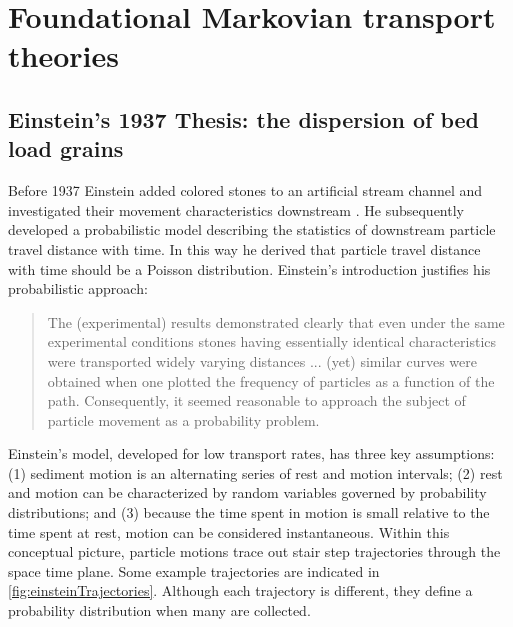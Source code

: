 \section{Foundational Markovian transport theories} 

\subsection*{Einstein's 1937 Thesis: the dispersion of bed load grains} 

Before 1937 Einstein added colored stones to an artificial stream channel and investigated their movement characteristics downstream \citep{Einstein1937}. 
He subsequently developed a probabilistic model describing the statistics of downstream particle travel distance with time. 
In this way he derived that particle travel distance with time should be a Poisson distribution. 
Einstein's introduction justifies his probabilistic approach: 
\begin{quote}
The (experimental) results demonstrated clearly that even under the same experimental conditions stones having essentially identical characteristics were transported widely varying distances ... (yet) similar curves were obtained when one plotted the frequency of particles as a function of the path. 
Consequently, it seemed reasonable to approach the subject of particle movement as a probability problem.  
\end{quote} 

Einstein's model, developed for low transport rates, has three key assumptions: (1) sediment motion is an alternating series of rest and motion intervals; (2) rest and motion can be characterized by random variables governed by probability distributions; and (3) because the time spent in motion is small relative to the time spent at rest, motion can be considered instantaneous. 
Within this conceptual picture, particle motions trace out stair step trajectories through the space time plane. 
Some example trajectories are indicated in \ref{fig:einsteinTrajectories}.
Although each trajectory is different, they define a probability distribution when many are collected. 


